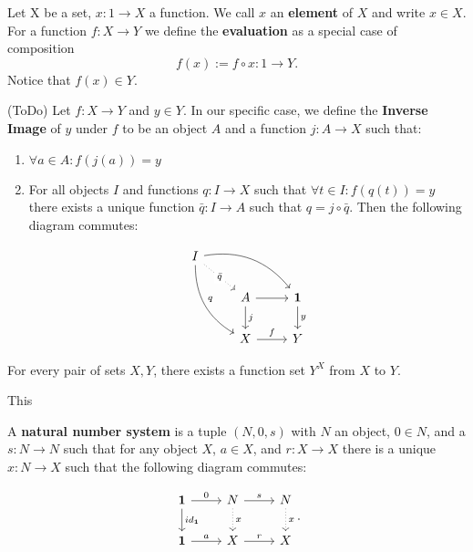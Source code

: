 \begin{definition}
Let X be a set, $x: 1 \longrightarrow X$ a function. We call $x$ an \textbf{element} of $X$ and write $x \in X$. For a function $f:X \longrightarrow Y$ we define the \textbf{evaluation} as a special case of composition 
\begin{equation*}
f(x) := f \circ x: 1 \longrightarrow Y.
\end{equation*}
Notice that $f(x) \in Y$.
\end{definition}

\begin{definition}
(ToDo) Let $f: X \longrightarrow Y$ and $y \in Y$. In our specific case, we define the \textbf{Inverse Image} of $y$ under $f$ to be an object $A$ and a function $j:A \longrightarrow X$ such that:
\begin{enumerate}
\item $\forall a \in A: f(j(a)) = y$
\item For all objects $I$ and functions $q: I \longrightarrow X$ such that $\forall t \in I: f(q(t)) = y$ there exists a unique function $\bar{q}: I \longrightarrow A$ such that $q = j \circ \bar{q}$. Then the following diagram commutes: 

\begin{equation*}
\begin{tikzcd}
I
\arrow[drr, bend left, ""]
\arrow[ddr, bend right, "q"]
\arrow[dr, dotted, "{\bar{q}}" description] & & \\
& A \arrow[r, ""] \arrow[d, "j"]
& \mathbf{1} \arrow[d, "y"] \\
& X \arrow[r, "f"]
& Y
\end{tikzcd}
\end{equation*}


\end{enumerate}
\end{definition}

\begin{axiom}
For every pair of sets $X, Y$, there exists a function set $Y^X$ from $X$ to $Y$.
\end{axiom}

\begin{remark}
This 
\end{remark}




\begin{definition}
A \textbf{natural number system} is a tuple $(N,0,s)$ with $N$ an object, $0 \in N$, and a $s: N \longrightarrow N$ such that for any object $X$, $a \in X$, and $r: X \longrightarrow X$
there is a unique $x: N \longrightarrow X$ such that the following diagram commutes:

\begin{equation*}
\begin{tikzcd}
\mathbf{1} \arrow[r, "0"] \arrow[d, "id_\mathbf{1}"]
& N \arrow[r, "s"] \arrow[d, "x", dotted]
& N \arrow[d, "x", dotted]   \\
\mathbf{1} \arrow[r, "a"]
& X \arrow[r, "r"]
& X
\end{tikzcd}.
\end{equation*}

\end{definition}


